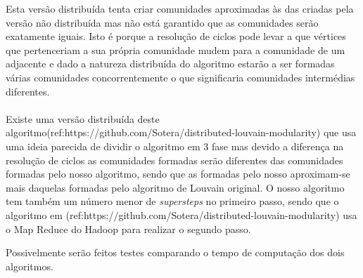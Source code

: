 \documentclass[a4paper,10pt]{report}
\begin{document}
Esta versão distribuída tenta criar comunidades aproximadas às das criadas pela versão não distribuída mas não está garantido que as comunidades serão exatamente iguais. Isto é porque a resolução de ciclos pode levar a que vértices que pertenceriam a sua própria comunidade mudem para a comunidade de um adjacente e dado a natureza distribuída do algoritmo estarão a ser formadas várias comunidades concorrentemente o que significaria comunidades intermédias diferentes.

\paragraph{}
Existe uma versão distribuída deste algoritmo(ref:https://github.com/Sotera/distributed-louvain-modularity) que usa uma ideia parecida de dividir o algoritmo em 3 fase mas devido a diferença na resolução de ciclos as comunidades formadas serão diferentes das comunidades formadas pelo nosso algoritmo, sendo que as formadas pelo nosso aproximam-se mais daquelas formadas pelo algoritmo de Louvain original. O nosso algoritmo tem também um número menor de \textit{supersteps} no primeiro passo, sendo que o algoritmo em (ref:https://github.com/Sotera/distributed-louvain-modularity) usa o Map Reduce do Hadoop para realizar o segundo passo.

Possivelmente serão feitos testes comparando o tempo de computação dos dois algoritmos.
\end{document}
